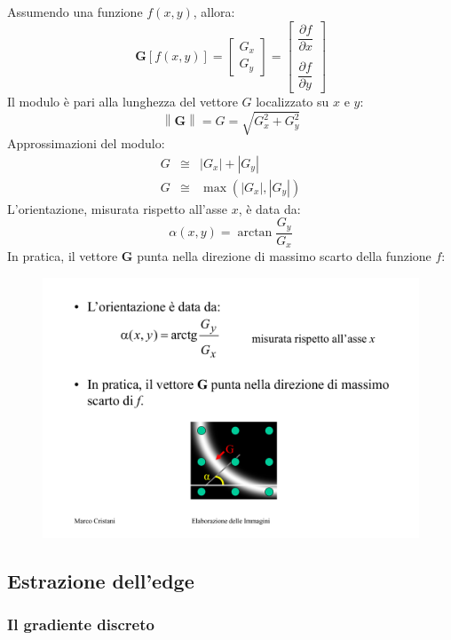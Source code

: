 \documentclass[a4paper]{article}
\begin{document}
	\noindent
	Assumendo una funzione $f\left(x,y\right)$, allora:
	\begin{equation*}
		\boldsymbol{G}\left[f\left(x,y\right)\right] = \begin{bmatrix}
			G_{x} \\
			G_{y}
		\end{bmatrix} = \begin{bmatrix}
		\dfrac{\partial f}{\partial x} \\
		\\
		\dfrac{\partial f}{\partial y}
	\end{bmatrix}
	\end{equation*}
	Il modulo è pari alla lunghezza del vettore $G$ localizzato su $x$ e $y$:
	\begin{equation*}
		\left\| \boldsymbol{G} \right\| = G = \sqrt{G_{x}^{2} + G_{y}^{2}}
	\end{equation*}
	Approssimazioni del modulo:
	\begin{equation*}
		\begin{array}{lll}
			G & \cong & \left| G_{x} \right| + \left| G_{y} \right| \\
			G & \cong & \max\left(\left| G_{x} \right|, \left| G_{y} \right|\right)
		\end{array}	
	\end{equation*}
	L'orientazione, misurata rispetto all'asse $x$, è data da:
	\begin{equation*}
		\alpha\left(x,y\right) = \arctan\dfrac{G_{y}}{G_{x}}
	\end{equation*}
	In pratica, il vettore $\boldsymbol{G}$ punta nella direzione di massimo scarto della funzione $f$:
	\begin{figure}[!htp]
		\centering
		\includegraphics[width=.3\textwidth]{img/gradiente_direzione.pdf}
	\end{figure}\newpage
	
	\subsection{Estrazione dell'edge}
	
	\subsubsection{Il gradiente discreto}
	
\end{document}
